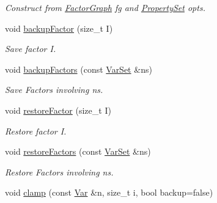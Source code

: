 \begin{CompactItemize}
\begin{CompactList}\small\item\em Construct from \hyperlink{classdai_1_1FactorGraph}{FactorGraph} fg and \hyperlink{classdai_1_1PropertySet}{PropertySet} opts. \item\end{CompactList}\item 
\hypertarget{classdai_1_1DAIAlg_48ba6a58d10b8802d690e5e92ec5abe9}{
void \hyperlink{classdai_1_1DAIAlg_48ba6a58d10b8802d690e5e92ec5abe9}{backupFactor} (size\_\-t I)}
\label{classdai_1_1DAIAlg_48ba6a58d10b8802d690e5e92ec5abe9}

\begin{CompactList}\small\item\em Save factor I. \item\end{CompactList}\item 
\hypertarget{classdai_1_1DAIAlg_0176904d3b4b9d083288ea8c4a2dc8bc}{
void \hyperlink{classdai_1_1DAIAlg_0176904d3b4b9d083288ea8c4a2dc8bc}{backupFactors} (const \hyperlink{classdai_1_1VarSet}{VarSet} \&ns)}
\label{classdai_1_1DAIAlg_0176904d3b4b9d083288ea8c4a2dc8bc}

\begin{CompactList}\small\item\em Save Factors involving ns. \item\end{CompactList}\item 
\hypertarget{classdai_1_1DAIAlg_bf8dbd2797ec871e86566a6dfc0864e3}{
void \hyperlink{classdai_1_1DAIAlg_bf8dbd2797ec871e86566a6dfc0864e3}{restoreFactor} (size\_\-t I)}
\label{classdai_1_1DAIAlg_bf8dbd2797ec871e86566a6dfc0864e3}

\begin{CompactList}\small\item\em Restore factor I. \item\end{CompactList}\item 
\hypertarget{classdai_1_1DAIAlg_3ce97e9370f1cdc785526c1a6c1eaadf}{
void \hyperlink{classdai_1_1DAIAlg_3ce97e9370f1cdc785526c1a6c1eaadf}{restoreFactors} (const \hyperlink{classdai_1_1VarSet}{VarSet} \&ns)}
\label{classdai_1_1DAIAlg_3ce97e9370f1cdc785526c1a6c1eaadf}

\begin{CompactList}\small\item\em Restore Factors involving ns. \item\end{CompactList}\item 
\hypertarget{classdai_1_1DAIAlg_b7d537f1a9d116617d8dce722ce65dc0}{
void \hyperlink{classdai_1_1DAIAlg_b7d537f1a9d116617d8dce722ce65dc0}{clamp} (const \hyperlink{classdai_1_1Var}{Var} \&n, size\_\-t i, bool backup=false)}
\label{classdai_1_1DAIAlg_b7d537f1a9d116617d8dce722ce65dc0}


\end{CompactItemize}
